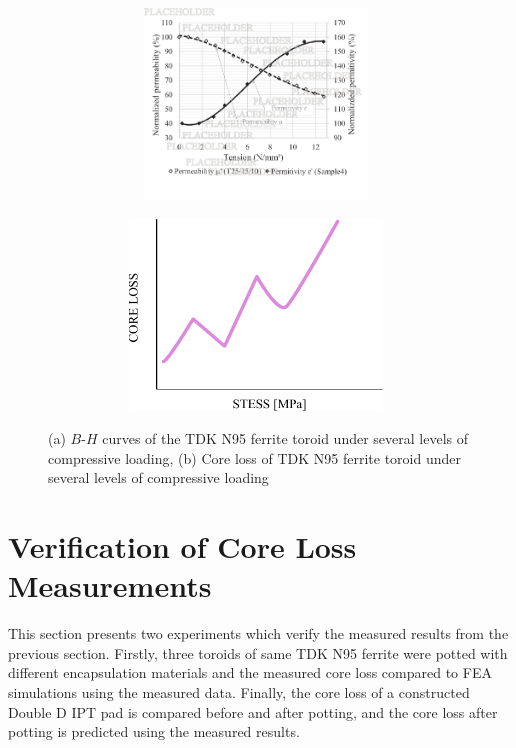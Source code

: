 \documentclass[conference]{IEEEtran}
\begin{document}
\begin{figure}[t]
  \centering
  \begin{subfigure}{\columnwidth}
    \includegraphics[width=3.5in, height=2in]{figures/changingBH.pdf}
    \caption{}
    \label{fig:changingBH}
  \end{subfigure}
  \begin{subfigure}{\columnwidth}
    \centering
    \includegraphics[width=3.5in, height=2in]{figures/coreloss.pdf}
    \caption{}
    \label{fig:coreloss}
  \end{subfigure}
  \caption{(a) $B$-$H$ curves of the TDK N95 ferrite toroid under several levels of compressive loading, (b) Core loss of TDK N95 ferrite toroid under several levels of compressive loading}
\end{figure}

\section{Verification of Core Loss Measurements}

This section presents two experiments which verify the measured results from the previous section. 
Firstly, three toroids of same TDK N95 ferrite were potted with different encapsulation materials and the measured core loss compared to FEA simulations using the measured data. 
Finally, the core loss of a constructed Double D IPT pad is compared before and after potting, and the core loss after potting is predicted using the measured results. 
\end{document}
